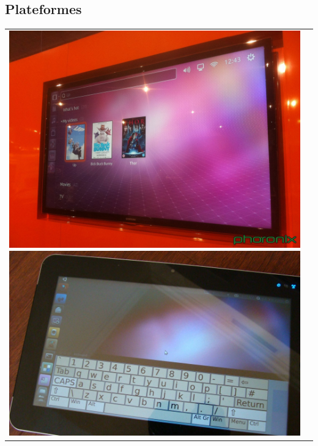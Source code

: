 \documentclass{beamer}
\begin{document}
\subsection*{Plateformes}
\begin{frame}
\begin{tabular}{c c}
\begin{minipage}{0.55\linewidth}
\includegraphics[width=0.9\linewidth]{images/tv}
\includegraphics[width=0.9\linewidth]{images/tablette}
\end{minipage}
&
\begin{minipage}{0.4\linewidth}

\end{minipage}
\end{tabular}
\end{frame}
\end{document}
